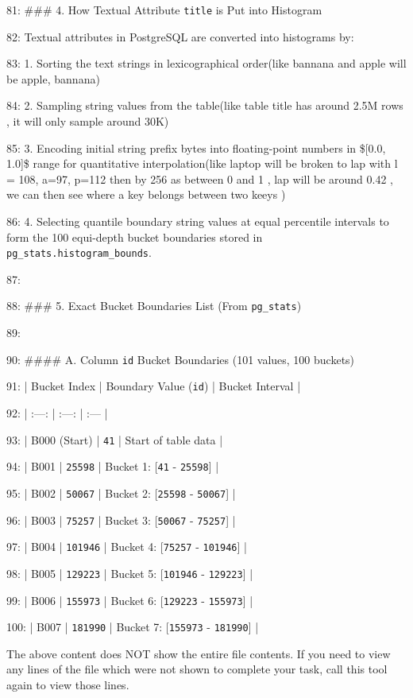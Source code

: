 \documentclass[11pt,a4paper]{article}
\begin{document}
{81: \#\#\# 4. How Textual Attribute \texttt{title} is Put into Histogram

82: Textual attributes in PostgreSQL are converted into histograms by:

83: 1. Sorting the text strings in lexicographical order(like bannana and apple will be apple, bannana)

84: 2. Sampling string values from the table(like table title has around 2.5M rows , it will only sample around 30K)

85: 3. Encoding initial string prefix bytes into floating-point numbers in \$[0.0, 1.0]\$ range for quantitative interpolation(like laptop will be broken to lap with l = 108, a=97, p=112 then by 256 as between 0 and 1 , lap will be around 0.42 , we can then see where a key belongs between two keeys )

86: 4. Selecting quantile boundary string values at equal percentile intervals to form the 100 equi-depth bucket boundaries stored in \texttt{pg\_stats.histogram\_bounds}.

87:

88: \#\#\# 5. Exact Bucket Boundaries List (From \texttt{pg\_stats})

89:

90: \#\#\#\# A. Column \texttt{id} Bucket Boundaries (101 values, 100 buckets)

91: | Bucket Index | Boundary Value (\texttt{id}) | Bucket Interval |

92: | :---: | :---: | :--- |

93: | B000 (Start) | \texttt{41} | Start of table data |

94: | B001 | \texttt{25598} | Bucket 1: [\texttt{41} - \texttt{25598}] |

95: | B002 | \texttt{50067} | Bucket 2: [\texttt{25598} - \texttt{50067}] |

96: | B003 | \texttt{75257} | Bucket 3: [\texttt{50067} - \texttt{75257}] |

97: | B004 | \texttt{101946} | Bucket 4: [\texttt{75257} - \texttt{101946}] |

98: | B005 | \texttt{129223} | Bucket 5: [\texttt{101946} - \texttt{129223}] |

99: | B006 | \texttt{155973} | Bucket 6: [\texttt{129223} - \texttt{155973}] |

100: | B007 | \texttt{181990} | Bucket 7: [\texttt{155973} - \texttt{181990}] |

The above content does NOT show the entire file contents. If you need to view any lines of the file which were not shown to complete your task, call this tool again to view those lines.


}
\end{document}
